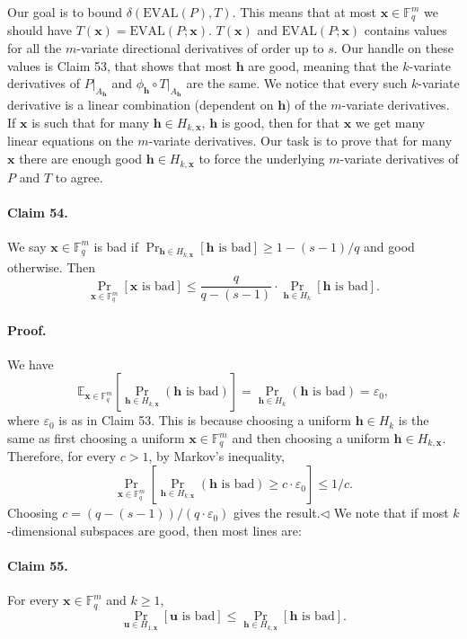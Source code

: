 Our goal is to bound $\delta(\mathrm{EVAL}(P),T)$. This means that at most $\boldsymbol x\in\mathbb F_q^m$ we should have $T(\boldsymbol x)=\mathrm{EVAL}(P;\boldsymbol x)$. $T(\boldsymbol x)$ and $\mathrm{EVAL}(P;\boldsymbol x)$ contains values for all the $m$-variate directional derivatives of order up to $s$. Our handle on these values is Claim 53, that shows that most $\boldsymbol h$ are good, meaning that the $k$-variate derivatives of $P|_{A_{\boldsymbol h}}$ and $\phi_{\boldsymbol h}\circ T|_{A_{\boldsymbol h}}$ are the same. We notice that every such $k$-variate derivative is a linear combination (dependent on $\boldsymbol h$) of the $m$-variate derivatives. If $\boldsymbol x$ is such that for many $\boldsymbol h\in H_{k,\boldsymbol x}$, $\boldsymbol h$ is good, then for that $\boldsymbol x$ we get many linear equations on the $m$-variate derivatives. Our task is to prove that for many $\boldsymbol x$ there are enough good $\boldsymbol h\in H_{k,\boldsymbol x}$ to force the underlying $m$-variate derivatives of $P$ and $T$ to agree.
\paragraph{Claim 54.} We say $\boldsymbol x\in\mathbb F_q^m$ is bad if $\Pr_{\boldsymbol h\in H_{k,\boldsymbol x}}[\boldsymbol h\text{ is bad}]\geq1-(s-1)/q$ and good otherwise. Then
\[\Pr_{\boldsymbol x\in\mathbb F_q^m}[\boldsymbol x\text{ is bad}]\leq\frac q{q-(s-1)}\cdot\Pr_{\boldsymbol h\in H_k}[\boldsymbol h\text{ is bad}].\]
\paragraph{Proof.} We have
\[\mathbb E_{\boldsymbol x\in\mathbb F_q^m}\left[\Pr_{\boldsymbol h\in H_{k,\boldsymbol x}}(\boldsymbol h\text{ is bad})\right]=\Pr_{\boldsymbol h\in H_k}(\boldsymbol h\text{ is bad})=\varepsilon_0,\]
where $\varepsilon_0$ is as in Claim 53. This is because choosing a uniform $\boldsymbol h\in H_k$ is the same as first choosing a uniform $\boldsymbol x\in\mathbb F_q^m$ and then choosing a uniform $\boldsymbol h\in H_{k,\boldsymbol x}$. Therefore, for every $c>1$, by Markov's inequality,
\[\Pr_{\boldsymbol x\in\mathbb F_q^m}\left[\Pr_{\boldsymbol h\in H_{k,\boldsymbol x}}(\boldsymbol h\text{ is bad})\geq c\cdot\varepsilon_0\right]\leq1/c.\]
Choosing $c=(q-(s-1))/(q\cdot\varepsilon_0)$ gives the result.\hfill$\triangleleft$
We note that if most $k$-dimensional subspaces are good, then most lines are:
\paragraph{Claim 55.} For every $\boldsymbol x\in\mathbb F_q^m$ and $k\geq1$,
\[\Pr_{\boldsymbol u\in H_{1,\boldsymbol x}}[\boldsymbol u\text{ is bad}]\leq\Pr_{\boldsymbol h\in H_{k,\boldsymbol x}}[\boldsymbol h\text{ is bad}].\]
